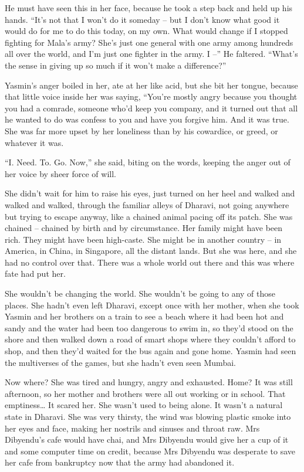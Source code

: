 He must have seen this in her face, because he took a step back and
held up his hands. ``It's not that I won't do it someday -- but I
don't know what good it would do for me to do this today, on my
own. What would change if I stopped fighting for Mala's army? She's
just one general with one army among hundreds all over the world,
and I'm just one fighter in the army. I --'' He faltered. ``What's
the sense in giving up so much if it won't make a difference?''

Yasmin's anger boiled in her, ate at her like acid, but she bit her
tongue, because that little voice inside her was saying, ``You're
mostly angry because you thought you had a comrade, someone who'd
keep you company, and it turned out that all he wanted to do was
confess to you and have you forgive him. And it was true. She was
far more upset by her loneliness than by his cowardice, or greed,
or whatever it was.

``I. Need. To. Go. Now,'' she said, biting on the words, keeping the
anger out of her voice by sheer force of will.

She didn't wait for him to raise his eyes, just turned on her heel
and walked and walked and walked, through the familiar alleys of
Dharavi, not going anywhere but trying to escape anyway, like a
chained animal pacing off its patch. She was chained -- chained by
birth and by circumstance. Her family might have been rich. They
might have been high-caste. She might be in another country -- in
America, in China, in Singapore, all the distant lands. But she was
here, and she had no control over that. There was a whole world out
there and this was where fate had put her.

She wouldn't be changing the world. She wouldn't be going to any of
those places. She hadn't even left Dharavi, except once with her
mother, when she took Yasmin and her brothers on a train to see a
beach where it had been hot and sandy and the water had been too
dangerous to swim in, so they'd stood on the shore and then walked
down a road of smart shops where they couldn't afford to shop, and
then they'd waited for the bus again and gone home. Yasmin had seen
the multiverses of the games, but she hadn't even seen Mumbai.

Now where? She was tired and hungry, angry and exhausted. Home? It
was still afternoon, so her mother and brothers were all out
working or in school. That emptiness\ldots{} It scared her. She wasn't
used to being alone. It wasn't a natural state in Dharavi. She was
very thirsty, the wind was blowing plastic smoke into her eyes and
face, making her nostrils and sinuses and throat raw. Mrs
Dibyendu's cafe would have chai, and Mrs Dibyendu would give her a
cup of it and some computer time on credit, because Mrs Dibyendu
was desperate to save her cafe from bankruptcy now that the army
had abandoned it.

